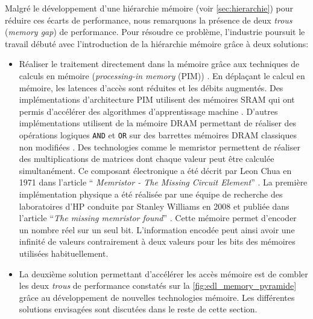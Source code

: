         Malgré le développement d'une hiérarchie mémoire (voir \autoref{sec:hierarchie}) pour réduire ces écarts de performance, nous remarquons  la présence de deux \textit{trous} (\textit{memory gap}) de performance. Pour résoudre ce problème, l'industrie poursuit le travail débuté avec l'introduction de la hiérarchie mémoire grâce à deux solutions: 
        \begin{itemize}
            \item Réaliser le traitement directement dans la mémoire grâce aux techniques de calculs en mémoire (\textit{processing-in memory} (PIM)) \cite{Singh2019}. En déplaçant le calcul en mémoire, les latences d'accès sont réduites et les débits augmentés. Des implémentations d'architecture PIM utilisent des mémoires SRAM qui ont permis d'accélérer des algorithmes d'apprentissage machine \cite{Zhang2016, Biswas2018, Kang2018}. D'autres implémentations utilisent de la mémoire DRAM \cite{Seshadri2017} \cite{Li2017} permettant de réaliser des opérations logiques \verb|AND| et \verb|OR| sur des  barrettes mémoires DRAM classiques non modifiées \cite{Gao2019}. Des technologies comme le memristor permettent de réaliser des multiplications de matrices dont chaque valeur peut être calculée simultanément. Ce composant électronique a été décrit par Leon Chua en 1971 dans l'article ``\textit{ Memristor - The Missing Circuit Element}''  \cite{Chua1971}. La première implémentation physique a été réalisée par une équipe de recherche des laboratoires d'HP conduite par Stanley Williams en 2008 et publiée dans l'article ``\textit{The missing memristor found}'' \cite{Strukov2008}. Cette mémoire permet d'encoder un nombre réel sur un seul bit. L'information encodée peut ainsi avoir une infinité de valeurs contrairement à deux valeurs pour les bits des mémoires utilisées habituellement.
            
            \item La deuxième solution permettant d'accélérer les accès mémoire est de combler les deux \textit{trous} de performance constatés sur la \autoref{fig:edl_memory_pyramide} grâce au développement de nouvelles technologies mémoire. Les différentes solutions envisagées sont discutées dans le reste de cette section.
        \end{itemize}
        
        
    
    
